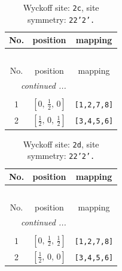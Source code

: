 \documentclass[fleqn,8pt]{jsarticle}
\begin{document}
\renewcommand{\arraystretch}{1.2}
\begin{longtable}{ccc}
\caption{Wyckoff site: {\tt 2c}, site symmetry: {\tt 22'2'.}}
 \\
 \hline \hline
No. & position & mapping \\ \hline \endfirsthead

\multicolumn{2}{l}{\tablename\ \thetable{}} \\
 \hline \hline
No. & position & mapping \\ \hline \endhead

 \hline \hline
\multicolumn{2}{r}{\footnotesize\it continued ...} \\ \endfoot

 \hline \hline
\multicolumn{2}{r}{} \\ \endlastfoot

1 & $\left[ 0,\, \frac{1}{2},\, 0 \right]$ & {\tt [1,2,7,8]} \\ \hline
2 & $\left[ \frac{1}{2},\, 0,\, \frac{1}{2} \right]$ & {\tt [3,4,5,6]} \\
\end{longtable}
\renewcommand{\arraystretch}{1.2}
\begin{longtable}{ccc}
\caption{Wyckoff site: {\tt 2d}, site symmetry: {\tt 22'2'.}}
 \\
 \hline \hline
No. & position & mapping \\ \hline \endfirsthead

\multicolumn{2}{l}{\tablename\ \thetable{}} \\
 \hline \hline
No. & position & mapping \\ \hline \endhead

 \hline \hline
\multicolumn{2}{r}{\footnotesize\it continued ...} \\ \endfoot

 \hline \hline
\multicolumn{2}{r}{} \\ \endlastfoot

1 & $\left[ 0,\, \frac{1}{2},\, \frac{1}{2} \right]$ & {\tt [1,2,7,8]} \\ \hline
2 & $\left[ \frac{1}{2},\, 0,\, 0 \right]$ & {\tt [3,4,5,6]} \\
\end{longtable}
\renewcommand{\arraystretch}{1.2}
\end{document}

